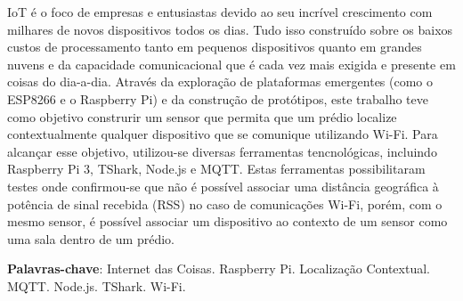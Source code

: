\setlength{\absparsep}{18pt} %
\begin{resumo}

	IoT é o foco de empresas e entusiastas devido ao seu incrível crescimento com
	milhares de novos dispositivos todos os dias. Tudo isso construído sobre os
	baixos custos de processamento tanto em pequenos dispositivos quanto em
	grandes nuvens e da capacidade comunicacional que é cada vez mais exigida e
	presente em coisas do dia-a-dia.
	Através da exploração de plataformas emergentes (como o ESP8266 e o Raspberry
	Pi) e da construção de protótipos, este trabalho teve como objetivo
	construrir um sensor que permita que um prédio localize contextualmente
	qualquer dispositivo que se comunique utilizando Wi-Fi. Para
	alcançar esse objetivo, utilizou-se diversas ferramentas tencnológicas,
	incluindo Raspberry Pi 3, TShark, Node.js e MQTT. Estas ferramentas
	possibilitaram testes onde confirmou-se que não é possível associar uma
	distância geográfica à potência de sinal recebida (RSS) no caso de
	comunicações Wi-Fi, porém, com o mesmo sensor, é possível associar um
	dispositivo ao contexto de um sensor como uma sala dentro de um prédio.

	\textbf{Palavras-chave}: Internet das Coisas. Raspberry Pi. Localização Contextual. MQTT. Node.js. TShark. Wi-Fi.
\end{resumo}
